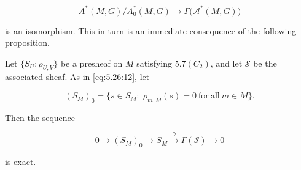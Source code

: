 \begin{equation}
\tag{17}\label{eq:5.26:17}
A^{*}(M,G)/A_{0}^{*}(M,G)\to\Gamma\bigl(\mathcal{A}^{*}(M,G)\bigr)
\end{equation}

is an isomorphism. This in turn is an immediate consequence of the following proposition.

\begin{proposition}\label{thm:5.27}
Let $\{S_U; \rho_{U,V}\}$ be a presheaf on $M$ satisfying $5.7(C_2)$, and let $\mathcal{S}$ be the associated sheaf. As in \eqref{eq:5.26:12}, let

\begin{equation}
\tag{1}\label{eq:5.27:1}
(S_{M})_{0}=\{s\in S_{M}\colon\;\rho_{m,M}(s)=0\ \mathrm{for\ all}\ m\in M\}.
\end{equation}

Then the sequence

\begin{equation}
\tag{2}\label{eq:5.27:2}
0\to(S_{M})_{0}\to S_{M}\xrightarrow{\gamma}\Gamma(\mathcal{S})\to0
\end{equation}

is exact.

\end{proposition}

